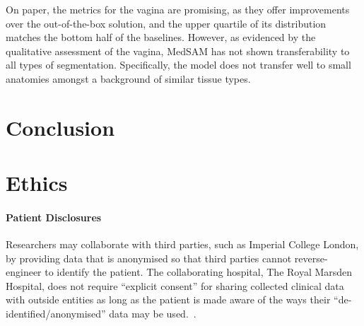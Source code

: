 \documentclass[11pt,twoside]{report}
\begin{document}
On paper, the metrics for the vagina are promising, as they offer improvements over the out-of-the-box solution, and the upper quartile of its distribution matches the bottom half of the baselines. However, as evidenced by the qualitative assessment of the vagina, MedSAM has not shown transferability to all types of segmentation. Specifically, the model does not transfer well to small anatomies amongst a background of similar tissue types. %

\chapter{Conclusion}\label{sect:conclusion}





\chapter{Ethics}

\subsubsection{Patient Disclosures}

Researchers may collaborate with third parties, such as Imperial College London, by providing data that is anonymised so that third parties cannot reverse-engineer to identify the patient. The collaborating hospital, The Royal Marsden Hospital, does not require ``explicit consent'' for sharing collected clinical data with outside entities as long as the patient is made aware of the ways their ``de-identified/anonymised'' data may be used.~\cite{royal-marsden-privacy-note}. 
\end{document}
